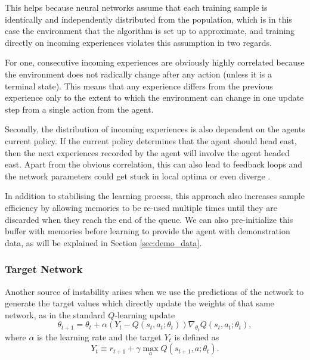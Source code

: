 This helps because neural networks assume that each training sample is identically and independently distributed from the population, which is in this case the environment that the algorithm is set up to approximate, and training directly on incoming experiences violates this assumption in two regards.

For one, consecutive incoming experiences are obviously highly correlated because the environment does not radically change after any action (unless it is a terminal state). This means that any experience differs from the previous experience only to the extent to which the environment can change in one update step from a single action from the agent.

Secondly, the distribution of incoming experiences is also dependent on the agents current policy. If the current policy determines that the agent should head east, then the next experiences recorded by the agent will involve the agent headed east. Apart from the obvious correlation, this can also lead to feedback loops and the network parameters could get stuck in local optima or even diverge \citep{tsitsiklis1997analysis,mnih2015human}.

In addition to stabilising the learning process, this approach also increases sample efficiency by allowing memories to be re-used multiple times until they are discarded when they reach the end of the queue. We can also pre-initialize this buffer with memories before learning to provide the agent with demonstration data, as will be explained in Section \ref{sec:demo_data}.


\subsubsection{Target Network}\label{sec:target_network}
Another source of instability arises when we use the predictions of the network to generate the target values which directly update the weights of that same network, as in the standard $Q$-learning update
\begin{equation}\label{eq:update_rule}
    \theta_{t+1} = \theta_t + \alpha(Y_t - Q(s_t, a_t; \theta_t))\nabla_{\theta_t}Q(s_t, a_t; \theta_t),
\end{equation}
where $\alpha$ is the learning rate and the target $Y_t$ is defined as
\begin{equation}\label{eq:target}
    Y_t \equiv r_{t+1} + \gamma \max_a Q(s_{t+1}, a; \theta_t).
\end{equation}

